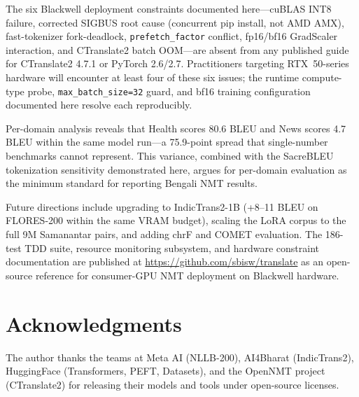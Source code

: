 \documentclass[journal]{IEEEtran}
\begin{document}
The six Blackwell deployment constraints documented here---cuBLAS INT8 failure,
corrected SIGBUS root cause (concurrent pip install, not AMD AMX),
fast-tokenizer fork-deadlock, \texttt{prefetch\_factor} conflict,
fp16/bf16 GradScaler interaction, and CTranslate2 batch OOM---are absent from
any published guide for CTranslate2 4.7.1 or PyTorch 2.6/2.7.
Practitioners targeting RTX~50-series hardware will encounter at least four of these
six issues; the runtime compute-type probe, \texttt{max\_batch\_size=32} guard, and
bf16 training configuration documented here resolve each reproducibly.

Per-domain analysis reveals that Health scores 80.6 BLEU and News scores 4.7 BLEU
within the same model run---a 75.9-point spread that single-number benchmarks
cannot represent.
This variance, combined with the SacreBLEU tokenization sensitivity demonstrated
here, argues for per-domain evaluation as the minimum standard for reporting
Bengali NMT results.

Future directions include upgrading to IndicTrans2-1B (+8--11 BLEU on FLORES-200
within the same VRAM budget), scaling the LoRA corpus to the full 9M Samanantar
pairs, and adding chrF and COMET evaluation.
The 186-test TDD suite, resource monitoring subsystem, and hardware constraint
documentation are published at \url{https://github.com/sbisw/translate} as an
open-source reference for consumer-GPU NMT deployment on Blackwell hardware.

\section*{Acknowledgments}

The author thanks the teams at Meta AI (NLLB-200), AI4Bharat (IndicTrans2),
HuggingFace (Transformers, PEFT, Datasets), and the OpenNMT project (CTranslate2)
for releasing their models and tools under open-source licenses.
\end{document}
